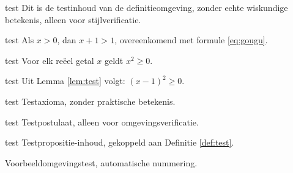 \documentclass[nl]{../../elegantbook}
\begin{document}
\ifdefined\simpleTest
\begin{definition}[Testdefinitie]\label{def:test}
\else
\begin{definition}[Testdefinitie]{test}
\fi
Dit is de testinhoud van de definitieomgeving, zonder echte wiskundige betekenis, alleen voor stijlverificatie.
\end{definition}

\ifdefined\simpleTest
\begin{theorem}[Teststelling]\label{thm:test}
\else
\begin{theorem}[Teststelling]{test}
\fi
Als $x>0$, dan $x+1>1$, overeenkomend met formule \eqref{eq:gougu}.
\end{theorem}

\ifdefined\simpleTest
\begin{lemma}[Testlemma]\label{lem:test}
\else
\begin{lemma}[Testlemma]{test}
\fi
Voor elk reëel getal $x$ geldt $x^2\geq0$.
\end{lemma}

\ifdefined\simpleTest
\begin{corollary}[Testgevolgtrekking]\label{cor:test}
\else
\begin{corollary}[Testgevolgtrekking]{test}
\fi
Uit Lemma \ref{lem:test} volgt: $(x-1)^2\geq0$.
\end{corollary}

\ifdefined\simpleTest
\begin{axiom}[Testaxioma]\label{axi:test}
\else
\begin{axiom}[Testaxioma]{test}
\fi
Testaxioma, zonder praktische betekenis.
\end{axiom}

\ifdefined\simpleTest
\begin{postulate}[Testpostulaat]\label{pos:test}
\else
\begin{postulate}[Testpostulaat]{test}
\fi
Testpostulaat, alleen voor omgevingsverificatie.
\end{postulate}

\ifdefined\simpleTest
\begin{proposition}[Testpropositie]\label{pro:test}
\else
\begin{proposition}[Testpropositie]{test}
\fi
Testpropositie-inhoud, gekoppeld aan Definitie \ref{def:test}.
\end{proposition}

\begin{example}\label{exa:test}
Voorbeeldomgevingstest, automatische nummering.
\end{example}


\end{proposition}
\end{postulate}
\end{axiom}
\end{corollary}
\end{lemma}
\end{theorem}
\end{definition}
\end{document}
